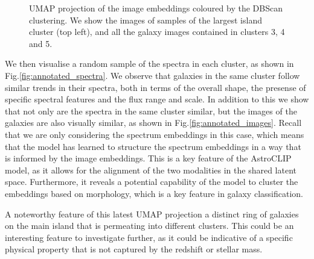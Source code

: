 \documentclass[draft, a4paper,12pt]{article}
\begin{document}
\begin{figure}[H]
    \centering
    \caption{UMAP projection of the image embeddings coloured by the DBScan clustering. We show the images of samples of the largest island cluster (top left), and all the galaxy images contained in clusters 3, 4 and 5.}
    \label{fig:umap_DBSCAN}
\end{figure}


We then visualise a random sample of the spectra in each cluster, as shown in Fig.\ref{fig:annotated_spectra}. We observe that galaxies in the same cluster follow similar trends in their spectra, both in terms of the overall shape, the presense of specific spectral features and the flux range and scale. In addition to this we show that not only are the spectra in the same cluster similar, but the images of the galaxies are also visually similar, as shown in Fig.\ref{fig:annotated_images}. Recall that we are only considering the spectrum embeddings in this case, which means that the model has learned to structure the spectrum embeddings in a way that is informed by the image embeddings. This is a key feature of the AstroCLIP model, as it allows for the alignment of the two modalities in the shared latent space. Furthermore, it reveals a potential capability of the model to cluster the embeddings based on morphology, which is a key feature in galaxy classification. 

A noteworthy feature of this latest UMAP projection a distinct ring of galaxies on the main island that is permeating into different clusters. This could be an interesting feature to investigate further, as it could be indicative of a specific physical property that is not captured by the redshift or stellar mass.
\end{document}
